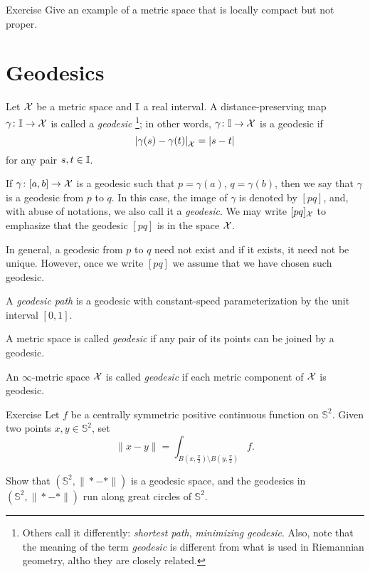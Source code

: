 \begin{thm}{Exercise}\label{ex:loc-compact-not-proper}
Give an example of a metric space that is locally compact but not proper.
\end{thm}

\section{Geodesics}
\label{sec:geods}

Let $\mathcal{X}$ be a metric space 
and $\II$\index{$\II$} a real interval. 
A distance-preserving map $\gamma\colon\mathbb{I}\to \mathcal{X}$ is called a \emph{geodesic}%
\footnote{Others call it differently: {}\emph{shortest path}, {}\emph{minimizing geodesic}.
Also, note that the meaning of the term {}\emph{geodesic} is different from what is used in Riemannian geometry, altho they are closely related.}; 
in other words, $\gamma\colon\mathbb{I}\to \mathcal{X}$ is a geodesic if 
\[\dist{\gamma(s)}{\gamma(t)}{\spc{X}}=|s-t|\]
for any pair $s,t\in \mathbb{I}$.

If $\gamma\colon[a,b]\to \mathcal{X}$ is a geodesic such that $p=\gamma(a)$, $q=\gamma(b)$, then we say that $\gamma$ is a geodesic from $p$ to $q$.
In this case, the image of $\gamma$ is denoted by $[p q]$\index{$[{*}{*}]$}, and, with abuse of notations, we also call it a \emph{geodesic}.
We may write $[p q]_{\mathcal{X}}$ 
to emphasize that the geodesic $[p q]$ is in the space  ${\mathcal{X}}$.

In general, a geodesic from $p$ to $q$ need not exist and if it exists, it need not  be unique.  
However, once we write $[p q]$ we assume that we have chosen such geodesic.

A \emph{geodesic path} is a geodesic with constant-speed parameterization by the unit interval $[0,1]$.

A metric space is called \emph{geodesic} if any pair of its points can be joined by a geodesic.

An $\infty$-metric space $\mathcal{X}$ is called {}\emph{geodesic} if each metric component of $\mathcal{X}$ is geodesic.

\begin{thm}{Exercise}\label{ex:pogorelov}
Let $f$ be a centrally symmetric positive continuous function on $\mathbb{S}^2$.
Given two points $x,y\in \mathbb{S}^2$,
set 
\[\|x-y\|=\int_{B(x,\frac \pi2)\setminus B(y,\frac\pi2)}f.\]

Show that $(\mathbb{S}^2,\|{*}-{*}\|)$ is a geodesic space,
and the geodesics in $(\mathbb{S}^2,\|{*}-{*}\|)$ run along great circles of $\mathbb{S}^2$.
\end{thm}

